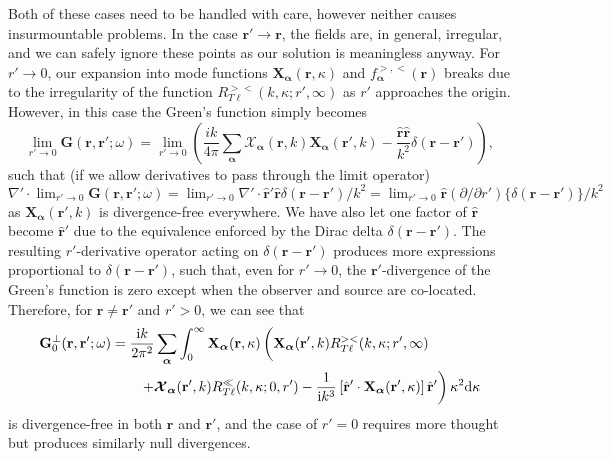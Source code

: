 \documentclass{article}
\begin{document}
Both of these cases need to be handled with care, however neither causes insurmountable problems. In the case $\mathbf{r}'\to\mathbf{r}$, the fields are, in general, irregular, and we can safely ignore these points as our solution is meaningless anyway. For $r'\to0$, our expansion into mode functions $\mathbf{X}_{\bm{\alpha}}(\mathbf{r},\kappa)$ and $f_{\bm{\alpha}}^{>,<}(\mathbf{r})$ breaks due to the irregularity of the function $R_{T\ell}^{><}(k,\kappa;r',\infty)$ as $r'$ approaches the origin. However, in this case the Green's function simply becomes
\begin{equation}
\lim_{r'\to0}\mathbf{G}(\mathbf{r},\mathbf{r}';\omega) = \lim_{r'\to0}\left(\frac{ik}{4\pi}\sum_{\bm{\alpha}}\bm{\mathcal{X}}_{\bm{\alpha}}(\mathbf{r},k)\mathbf{X}_{\bm{\alpha}}(\mathbf{r}',k) - \frac{\hat{\mathbf{r}}\hat{\mathbf{r}}}{k^2}\delta(\mathbf{r} - \mathbf{r}')\right),
\end{equation}
such that (if we allow derivatives to pass through the limit operator) $\nabla'\cdot\lim_{r'\to0}\mathbf{G}(\mathbf{r},\mathbf{r}';\omega) = \lim_{r'\to0}\nabla'\cdot\hat{\mathbf{r}}'\hat{\mathbf{r}}\delta(\mathbf{r} - \mathbf{r}')/k^2 = \lim_{r'\to0}\hat{\mathbf{r}}(\partial/\partial r')\{\delta(\mathbf{r} - \mathbf{r}')\}/k^2$ as $\mathbf{X}_{\bm{\alpha}}(\mathbf{r}',k)$ is divergence-free everywhere. We have also let one factor of $\hat{\mathbf{r}}$ become $\hat{\mathbf{r}}'$ due to the equivalence enforced by the Dirac delta $\delta(\mathbf{r} - \mathbf{r}')$. The resulting $r'$-derivative operator acting on $\delta(\mathbf{r} - \mathbf{r}')$ produces more expressions proportional to $\delta(\mathbf{r} - \mathbf{r}')$, such that, even for $r'\to 0$, the $\mathbf{r}'$-divergence of the Green's function is zero except when the observer and source are co-located. Therefore, for $\mathbf{r} \neq \mathbf{r}'$ and $r'>0$, we can see that
\begin{equation}\label{eq:G0transverse}
\begin{split}
\mathbf{G}_0^\perp(\mathbf{r},\mathbf{r}';\omega) &= \frac{\mathrm{i}k}{2\pi^2}\sum_{\bm{\alpha}}\int_0^\infty\mathbf{X}_{\bm{\alpha}}(\mathbf{r},\kappa)\left( \vphantom{\frac{1}{4\pi k^2}} \mathbf{X}_{\bm{\alpha}}(\mathbf{r}',k)R_{T\ell}^{><}(k,\kappa;r',\infty)\right.\\
&\qquad\left.+ \bm{\mathcal{X}}_{\bm{\alpha}}(\mathbf{r}',k)R_{T\ell}^\ll(k,\kappa;0,r') - \frac{1}{\mathrm{i} k^3}\left[\hat{\mathbf{r}}'\cdot\mathbf{X}_{\bm{\alpha}}(\mathbf{r}',\kappa)\right]\hat{\mathbf{r}}'\right)\kappa^2\mathrm{d}\kappa
\end{split}
\end{equation}
is divergence-free in both $\mathbf{r}$ and $\mathbf{r}'$, and the case of $r' = 0$ requires more thought but produces similarly null divergences.
\end{document}
